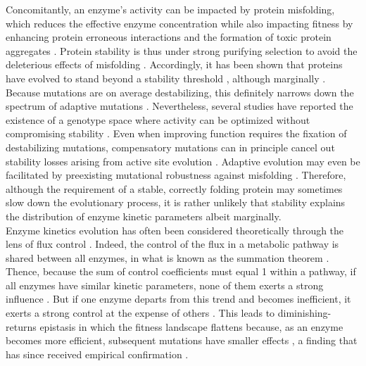 \documentclass[nogrid,crop,final]{MBE2}%
\begin{document}
Concomitantly, an enzyme's activity can be impacted by protein misfolding, which reduces the effective enzyme concentration \citep{Tokuriki09,Yue05,Drummond05,Echave17a} while also impacting fitness by enhancing protein erroneous interactions \citep{Yang12} and the formation of toxic protein aggregates \citep{Bucciantini02,Sabate10,Geiler-Samerotte11}. Protein stability is thus under strong purifying selection to avoid the deleterious effects of misfolding \citep{Drummond08}. Accordingly, it has been shown that proteins have evolved to stand beyond a stability threshold \citep{Bloom05}, although marginally \citep{Taverna02}. 
Because mutations are on average destabilizing, this definitely narrows down the spectrum of adaptive mutations \citep{Shoichet95,DePristo05, Weinreich06,Tokuriki07,Tokuriki08, Lunzer10}. Nevertheless, several studies have reported the existence of a genotype space where activity can be optimized without compromising stability \citep{Schreiber94,Burg02,Bloom04,Knies17,Miller17}. Even when improving function requires the fixation of destabilizing mutations, compensatory mutations can in principle cancel out stability losses arising from active site evolution \citep{DePristo05,Tokuriki08,Tokuriki09,Storz18}. Adaptive evolution may even be facilitated by preexisting mutational robustness against misfolding \citep{Bloom06,Bloom07}. Therefore, although the requirement of a stable, correctly folding protein may sometimes slow down the evolutionary process, it is rather unlikely that stability explains the distribution of enzyme kinetic parameters albeit marginally.\\




Enzyme kinetics evolution has often been considered theoretically through the lens of flux control \citep{Burns85,Clark91,Fell92,Kacser95,Yi19}. Indeed, the control of the flux in a metabolic pathway is shared between all enzymes, in what is known as the summation theorem \citep {Kacser73,Heinrich74}. Thence, because the sum of control coefficients must equal 1 within a pathway, if all enzymes have similar kinetic parameters, none of them exerts a strong influence \citep{Dean95}. But if one enzyme departs from this trend and becomes inefficient, it exerts a strong control at the expense of others \citep{Dykhuizen90}. This leads to diminishing-returns epistasis in which the fitness landscape flattens because, as an enzyme becomes more efficient, subsequent mutations have smaller effects \citep{Kacser73,Dykhuizen87,Tokuriki12}, a finding that has since received empirical confirmation \citep{Fell92,Dean95,Lunzer05,Yi19,Chou14}.
\end{document}
